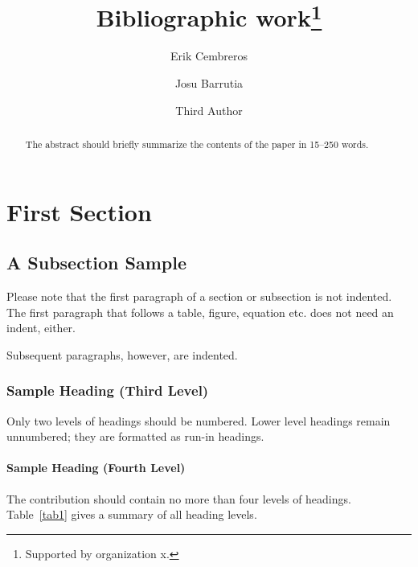 \documentclass[runningheads]{llncs}
\begin{document}
	\title{Bibliographic work\thanks{Supported by organization x.}}
	\author{Erik Cembreros \and
		Josu Barrutia \and
		Third Author}
	\maketitle              %
	\begin{abstract}
		The abstract should briefly summarize the contents of the paper in
		15--250 words.
		
	\end{abstract}
	\section{First Section}
	\subsection{A Subsection Sample}
	Please note that the first paragraph of a section or subsection is
	not indented. The first paragraph that follows a table, figure,
	equation etc. does not need an indent, either.
	
	Subsequent paragraphs, however, are indented.
	
	\subsubsection{Sample Heading (Third Level)} Only two levels of
	headings should be numbered. Lower level headings remain unnumbered;
	they are formatted as run-in headings.
	
	\paragraph{Sample Heading (Fourth Level)}
	The contribution should contain no more than four levels of
	headings. Table~\ref{tab1} gives a summary of all heading levels.
	
\end{document}
